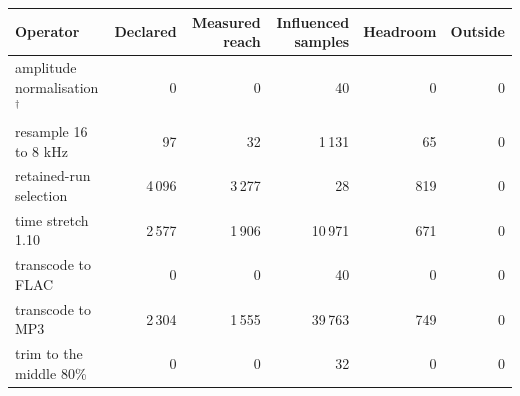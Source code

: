 \begin{tabular}{lrrrrr}
\toprule
Operator & Declared & Measured reach & Influenced samples & Headroom & Outside \\
\midrule
amplitude normalisation$^{\dagger}$ & 0 & 0 & 40 & 0 & 0 \\
resample 16 to 8 kHz & 97 & 32 & 1\,131 & 65 & 0 \\
retained-run selection & 4\,096 & 3\,277 & 28 & 819 & 0 \\
time stretch 1.10 & 2\,577 & 1\,906 & 10\,971 & 671 & 0 \\
transcode to FLAC & 0 & 0 & 40 & 0 & 0 \\
transcode to MP3 & 2\,304 & 1\,555 & 39\,763 & 749 & 0 \\
trim to the middle 80\% & 0 & 0 & 32 & 0 & 0 \\
\bottomrule
\end{tabular}
